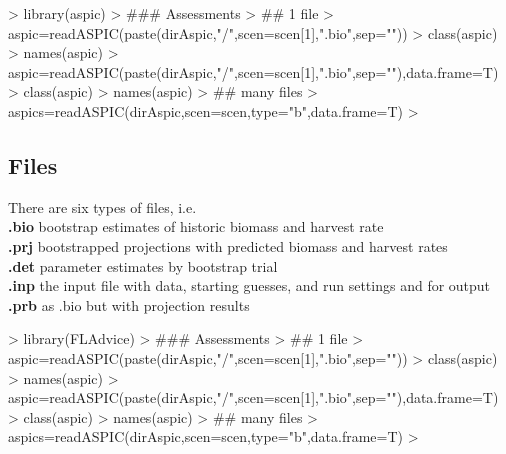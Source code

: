 \documentclass[shortnames,nojss,article]{jss}
\newenvironment{mylisting}
{\begin{list}{}{\setlength{\leftmargin}{1em}}\item\scriptsize\bfseries}
{\end{list}}
\begin{document}
\begin{mylisting}\begin{center}\begin{minipage}[H]{0.95\textwidth}\begin{shaded} 
\begin{Schunk}
\begin{Sinput}
> library(aspic)
> ### Assessments
> ## 1 file
> aspic=readASPIC(paste(dirAspic,"/",scen=scen[1],".bio",sep=""))
> class(aspic)
> names(aspic)
> aspic=readASPIC(paste(dirAspic,"/",scen=scen[1],".bio",sep=""),data.frame=T)
> class(aspic)
> names(aspic)
> ## many files
> aspics=readASPIC(dirAspic,scen=scen,type="b",data.frame=T)
> 
\end{Sinput}
\end{Schunk}
\end{shaded}\end{minipage}\end{center}\end{mylisting}



\subsection{Files}

There are six types of files, i.e.\\

 \textbf{.bio} bootstrap estimates of historic biomass and harvest rate\\
 \textbf{.prj}  bootstrapped projections with predicted biomass and harvest rates\\
 \textbf{.det}  parameter estimates by bootstrap trial\\
 \textbf{.inp}  the input file with data, starting guesses, and run settings and for output\\
 \textbf{.prb}  as .bio but with projection results\\


\begin{mylisting}\begin{center}\begin{minipage}[H]{0.95\textwidth}\begin{shaded} 
\begin{Schunk}
\begin{Sinput}
> library(FLAdvice)
> ### Assessments
> ## 1 file
> aspic=readASPIC(paste(dirAspic,"/",scen=scen[1],".bio",sep=""))
> class(aspic)
> names(aspic)
> aspic=readASPIC(paste(dirAspic,"/",scen=scen[1],".bio",sep=""),data.frame=T)
> class(aspic)
> names(aspic)
> ## many files
> aspics=readASPIC(dirAspic,scen=scen,type="b",data.frame=T)
> 
\end{Sinput}
\end{Schunk}
\end{shaded}\end{minipage}\end{center}\end{mylisting}
\end{document}
